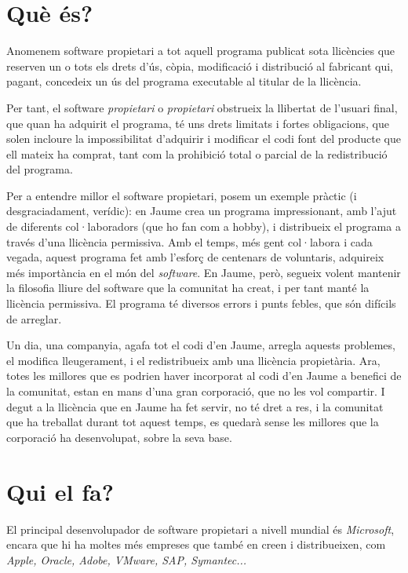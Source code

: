 \section{Què és?}

	Anomenem software propietari a tot aquell programa publicat sota llicències
	que reserven un o tots els drets d'ús, còpia, modificació i distribució
	al fabricant qui, pagant, concedeix un ús del programa executable al titular
	de la llicència.

	Per tant, el software \emph{propietari} o \emph{propietari} obstrueix la llibertat
	de l'usuari final, que quan ha adquirit el programa, té uns drets limitats i fortes
	obligacions, que solen incloure la impossibilitat d'adquirir i modificar el codi font del producte
	que ell mateix ha comprat, tant com la prohibició total o parcial de la redistribució del programa.
	\cite{gnucategories}

	Per a entendre millor el software propietari, posem un exemple pràctic (i desgraciadament, verídic):
	en Jaume crea un programa impressionant, amb l'ajut de diferents col·laboradors (que ho fan com a hobby),
	i distribueix el programa a través d'una llicència permissiva. Amb el temps, més gent col·labora i cada vegada,
	aquest programa fet amb l'esforç de centenars de voluntaris, adquireix més importància en el món del \emph{software}.
	En Jaume, però, segueix volent mantenir la filosofia lliure del software que la comunitat ha creat, i per tant
	manté la llicència permissiva. El programa té diversos errors i punts febles, que són difícils de arreglar.
	
	Un dia, una companyia, agafa tot el codi d'en Jaume, arregla aquests problemes, el modifica lleugerament, i
	el redistribueix amb una llicència propietària. Ara, totes les millores que es podrien haver incorporat
	al codi d'en Jaume a benefici de la comunitat, estan en mans d'una gran corporació, que no les vol compartir.
	I degut a la llicència que en Jaume ha fet servir, no té dret a res, i la comunitat que ha treballat durant tot aquest temps,
	es quedarà sense les millores que la corporació ha desenvolupat, sobre la seva base.

\section{Qui el fa?}

	El principal desenvolupador de software propietari a nivell mundial és \emph{Microsoft}, encara que hi
	ha moltes més empreses que també en creen i distribueixen, com \emph{Apple, Oracle, Adobe, VMware,
	SAP, Symantec...} \cite{propietariempreses}

